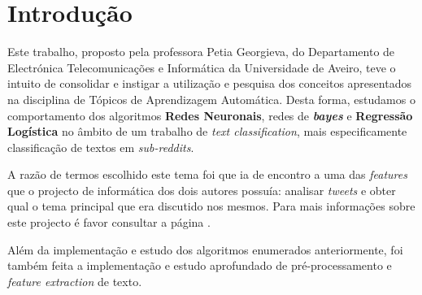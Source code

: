 \section{Introdução}
Este trabalho, proposto pela professora Petia Georgieva, do Departamento de Electrónica Telecomunicações e Informática da Universidade de Aveiro, teve o intuito de consolidar e instigar a utilização e pesquisa dos conceitos apresentados na disciplina de Tópicos de Aprendizagem Automática.
Desta forma, estudamos o comportamento dos algoritmos \textbf{Redes Neuronais}, redes de \textbf{\textit{bayes}} e \textbf{Regressão Logística} no âmbito de um trabalho de \textit{text classification}, mais especificamente classificação de textos em \textit{sub-reddits}. 

A razão de termos escolhido este tema foi que ia de encontro a uma das \textit{features} que o projecto de informática dos dois autores possuía: analisar \textit{tweets} e obter qual o tema principal que era discutido nos mesmos. Para mais informações sobre este projecto é favor consultar a página \cite{informatics_project}.

Além da implementação e estudo dos algoritmos enumerados anteriormente, foi também feita a implementação e estudo aprofundado de pré-processamento e \textit{feature extraction} de texto.
